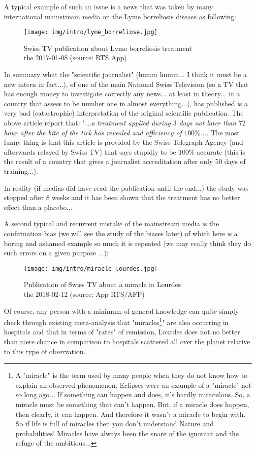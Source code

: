 	A typical example of such an issue is a news that was taken by many international mainstream media on the Lyme borreliosis disease as following:
	\begin{figure}[H]
		\centering
		\texttt{[image: img/intro/lyme\_borreliose.jpg]}
		\caption[Swiss TV publication about Lyme borreliosis treatment]{Swiss TV publication about Lyme borreliosis treatment\\ the 2017-01-08 (source: RTS App)}
	\end{figure}
	In summary what the "scientific journalist" (humm humm... I think it must be a new intern in fact...), of one of the main National Swiss Television (so a TV that has enough money to investigate correctly any news... at least in theory... in a country that assess to be number one in almost everything...), has published is a very bad (catastrophic) interpretation of the original scientific publication. The above article report that: "\textit{...a treatment applied during $3$ days not later than $72$ hour after the bite of the tick has revealed and efficiency of $100\%$...}. The most funny thing is that this article is provided by the Swiss Telegraph Agency (and afterwards relayed by Swiss TV) that says stupidly to be $100\%$ accurate (this is the result of a country that gives a journalist accreditation after only 50 days of training...).
	
	In reality (if medias did have read the publication until the end...) the study was stopped after $8$ weeks and it has been shown that the treatment has no better effect than a placebo...
	
	A second typical and recurrent mistake of the mainstream media is the confirmation bias (we will see the study of the biases later) of which here is a boring and ashamed example so much it is repeated (we may really think they do such errors on a given purpose ...):
	\begin{figure}[H]
		\centering
		\texttt{[image: img/intro/miracle\_lourdes.jpg]}
		\caption[Publication of Swiss TV on a miracle in Lourdes]{Publication of Swiss TV about a miracle in Lourdes\\ the 2018-02-12 (source: App RTS/AFP)}
	\end{figure}
	Of course, any person with a minimum of general knowledge can quite simply check through existing meta-analysis that "miracles\footnote{A "miracle" is the term used by many people when they do not know how to explain an observed phenomenon. Eclipses were an example of a "miracle" not so long ago... If something can happen and does, it's hardly miraculous. So, a miracle must be something that can't happen. But, if a miracle does happen, then clearly, it can happen. And therefore it wasn't a miracle to begin with. So if life is full of miracles then you don't understand Nature and probabilities! Miracles have always been the snare of the ignorant and the refuge of the ambitious...}" are also occurring in hospitals and that in terms of "rates" of remission, Lourdes does not no better than mere chance in comparison to hospitals scattered all over the planet relative to this type of observation.

